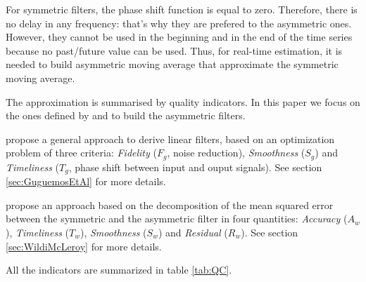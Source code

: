 \documentclass[
  12pt,
  ,
  a4paper]{article}
\newcommand\1{\mathds{1}}
\begin{document}
For symmetric filters, the phase shift function is equal to zero.
Therefore, there is no delay in any frequency: that's why they are prefered to the asymmetric ones.
However, they cannot be used in the beginning and in the end of the time series because no past/future value can be used.
Thus, for real-time estimation, it is needed to build asymmetric moving average that approximate the symmetric moving average.

The approximation is summarised by quality indicators.
In this paper we focus on the ones defined by \textcite{ch15HBSA} and \textcite{trilemmaWMR2019} to build the asymmetric filters.

\textcite{ch15HBSA} propose a general approach to derive linear filters, based on an optimization problem of three criteria: \emph{Fidelity} (\(F_g\), noise reduction), \emph{Smoothness} (\(S_g\)) and \emph{Timeliness} (\(T_g\), phase shift between input and ouput signals).
See section \ref{sec:GuguemosEtAl} for more details.

\textcite{trilemmaWMR2019} propose an approach based on the decomposition of the mean squared error between the symmetric and the asymmetric filter in four quantities: \emph{Accuracy} (\(A_w\)), \emph{Timeliness} (\(T_w\)), \emph{Smoothness} (\(S_w\)) and \emph{Residual} (\(R_w\)).
See section \ref{sec:WildiMcLeroy} for more details.

All the indicators are summarized in table \ref{tab:QC}.
\end{document}
